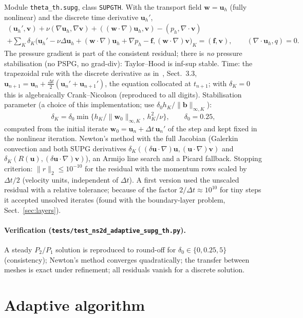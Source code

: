 \documentclass[11pt,a4paper]{article}
\newcommand{\bu}{\boldsymbol{u}}
\newcommand{\bv}{\boldsymbol{v}}
\newcommand{\bw}{\boldsymbol{w}}
\newcommand{\bff}{\boldsymbol{f}}
\newcommand{\dt}{\Delta t}
\newcommand{\code}[1]{\texttt{#1}}
\begin{document}
Module \code{theta\_th.supg}, class \code{SUPGTH}. With the transport field $\bw=\bu_h$ (fully nonlinear) and the
discrete time derivative $\bu_h'$,
\begin{multline*}
(\bu_h',\bv)+\nu(\nabla\bu_h,\nabla\bv)+((\bw\cdot\nabla)\bu_h,\bv)-(p_h,\nabla\cdot\bv)\\
+\sum_K\delta_K\big(\bu_h'-\nu\Delta\bu_h+(\bw\cdot\nabla)\bu_h+\nabla p_h-\bff,(\bw\cdot\nabla)\bv\big)_K=(\bff,\bv),
\qquad(\nabla\cdot\bu_h,q)=0.
\end{multline*}
The pressure gradient is part of the consistent residual; there is \emph{no} pressure stabilisation (no PSPG, no
grad-div): Taylor--Hood is inf-sup stable. Time: the trapezoidal rule with the discrete derivative as in~\cite{FGJN14},
Sect.~3.3, $\bu_{n+1}=\bu_n+\frac{\dt}2(\bu_n'+\bu_{n+1}')$, the equation collocated at $t_{n+1}$; with $\delta_K=0$ this
is algebraically Crank--Nicolson (reproduced to all digits). Stabilisation parameter (a choice of this implementation;
\cite{FGJN14} use $\delta_0h_K/\|\boldsymbol b\|_{\infty,K}$):
\[
\delta_K=\delta_0\min\big\{h_K/\|\bw_0\|_{\infty,K},\,h_K^2/\nu\big\},\qquad\delta_0=0.25,
\]
computed from the initial iterate $\bw_0=\bu_n+\dt\,\bu_n'$ of the step and kept fixed in the nonlinear iteration.
Newton's method with the full Jacobian (Galerkin convection and both SUPG derivatives
$\delta_K((\delta\bu\cdot\nabla)\bu,(\bu\cdot\nabla)\bv)$ and $\delta_K(R(\bu),(\delta\bu\cdot\nabla)\bv)$), an Armijo line
search and a Picard fallback. Stopping criterion: $\|r\|_2\le10^{-10}$ for the residual with the momentum rows scaled by
$\dt/2$ (velocity units, independent of $\dt$). A first version used the unscaled residual with a relative tolerance;
because of the factor $2/\dt\approx10^{10}$ for tiny steps it accepted unsolved iterates (found with the boundary-layer
problem, Sect.~\ref{sec:layers}).

\paragraph{Verification (\code{tests/test\_ns2d\_adaptive\_supg\_th.py}).} A steady $P_2/P_1$ solution is reproduced to
round-off for $\delta_0\in\{0,0.25,5\}$ (consistency); Newton's method converges quadratically; the transfer between
meshes is exact under refinement; all residuals vanish for a discrete solution.

\section{Adaptive algorithm}
\end{document}
